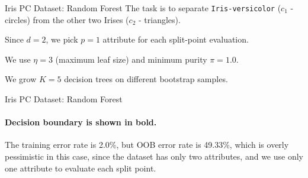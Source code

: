 \begin{frame}{Iris PC Dataset: Random Forest}
The task is to separate {\tt Iris-versicolor} ($c_1$ - circles) from the other two Irises ($c_2$ - triangles). 

\medskip
  
Since $d=2$, we pick $p=1$ attribute for each split-point evaluation.

\medskip

We use $\eta=3$ (maximum leaf size) and minimum purity $\pi=1.0$.

\medskip
  
We grow $K=5$ decision trees on different bootstrap samples. 
\end{frame}

\begin{frame}[fragile]{Iris PC Dataset: Random Forest}
\framesubtitle{ Decision boundary is shown in bold.}

The training error rate is 2.0\%, but OOB error rate is 49.33\%, which is
overly pessimistic in this case, since the dataset has only two
attributes, and we use only one attribute to evaluate each split
point. 

\vspace*{1cm}

\centerline{
}
\end{frame}

